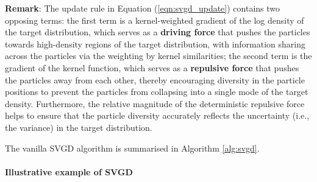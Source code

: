\textbf{Remark}: The update rule in Equation (\ref{eqn:svgd_update}) contains two opposing terms: the first term is a kernel-weighted gradient of the log density of the target distribution, which serves as a \textbf{driving force} \citep[e.g.,][]{liu_svgd, zhou_aump_svgd} that pushes the particles towards high-density regions of the target distribution, with information sharing across the particles via the weighting by kernel similarities; the second term is the gradient of the kernel function, which serves as a \textbf{repulsive force} \citep[e.g.,][]{liu_svgd, ba_variance_collapse} that pushes the particles away from each other, thereby encouraging diversity in the particle positions to prevent the particles from collapsing into a single mode of the target density. Furthermore, the relative magnitude of the deterministic repulsive force helps to ensure that the particle diversity accurately reflects the uncertainty (i.e., the variance) in the target distribution.

The vanilla SVGD algorithm is summarised in Algorithm \ref{alg:svgd}.


\paragraph*{Illustrative example of SVGD}

